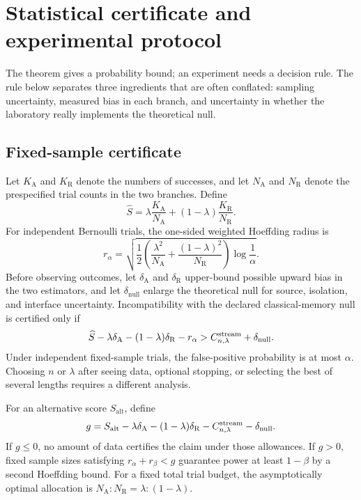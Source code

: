 \section{Statistical certificate and experimental protocol}
\label{sec:protocol}

The theorem gives a probability bound; an experiment needs a decision rule. The rule below separates three ingredients that are often conflated: sampling uncertainty, measured bias in each branch, and uncertainty in whether the laboratory really implements the theoretical null.

\subsection{Fixed-sample certificate}

Let $K_{\mathrm A}$ and $K_{\mathrm R}$ denote the numbers of successes, and let $N_{\mathrm A}$ and $N_{\mathrm R}$ denote the prespecified trial counts in the two branches. Define
\[
\widehat S=\lambda\frac{K_{\mathrm A}}{N_{\mathrm A}}
+(1-\lambda)\frac{K_{\mathrm R}}{N_{\mathrm R}}.
\]
For independent Bernoulli trials, the one-sided weighted Hoeffding radius is
\begin{equation}
r_\alpha=
\sqrt{\frac12\left(
\frac{\lambda^2}{N_{\mathrm A}}+
\frac{(1-\lambda)^2}{N_{\mathrm R}}
\right)\log\frac1\alpha}.
\label{eq:hoeffding}
\end{equation}
Before observing outcomes, let $\delta_{\mathrm A}$ and $\delta_{\mathrm R}$ upper-bound possible upward bias in the two estimators, and let $\delta_{\mathrm{null}}$ enlarge the theoretical null for source, isolation, and interface uncertainty. Incompatibility with the declared classical-memory null is certified only if
\begin{equation}
\widehat S-\lambda\delta_{\mathrm A}
-(1-\lambda)\delta_{\mathrm R}-r_\alpha
>C^{\mathrm{stream}}_{n,\lambda}+\delta_{\mathrm{null}}.
\label{eq:certificate}
\end{equation}
Under independent fixed-sample trials, the false-positive probability is at most $\alpha$. Choosing $n$ or $\lambda$ after seeing data, optional stopping, or selecting the best of several lengths requires a different analysis.

For an alternative score $S_{\mathrm{alt}}$, define
\[
g=S_{\mathrm{alt}}-\lambda\delta_{\mathrm A}
-(1-\lambda)\delta_{\mathrm R}
-C^{\mathrm{stream}}_{n,\lambda}-\delta_{\mathrm{null}}.
\]
If $g\leq0$, no amount of data certifies the claim under those allowances. If $g>0$, fixed sample sizes satisfying $r_\alpha+r_\beta<g$ guarantee power at least $1-\beta$ by a second Hoeffding bound. For a fixed total trial budget, the asymptotically optimal allocation is $N_{\mathrm A}:N_{\mathrm R}=\lambda:(1-\lambda)$.

